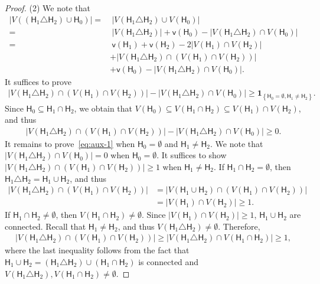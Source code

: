 \documentclass[letterpaper,11pt]{article}
\theoremstyle{definition}
\newcommand{\vn}{\mathsf{{v}}}
\newcommand{\sfH}{{\mathsf{H}}}
\newcommand{\indc}[1]{{\mathbf{1}_{\left\{{#1}\right\}}}}
\begin{document}
\begin{proof}
    (2) We note that \begin{align*}
        |V((\sfH_1\triangle \sfH_2)\cup \sfH_0)| =&~ |V(\sfH_1\triangle \sfH_2)\cup V(\sfH_0)|\\ =&~ |V(\sfH_1\triangle \sfH_2)|+\vn(\sfH_0) - |V(\sfH_1\triangle \sfH_2)\cap V(\sfH_0)|\\
        =&~\vn(\sfH_1)+\vn(\sfH_2)-2|V(\sfH_1)\cap V(\sfH_2)|\\&+|V(\sfH_1\triangle \sfH_2)\cap (V(\sfH_1)\cap V(\sfH_2))|\\&+\vn(\sfH_0) - |V(\sfH_1\triangle \sfH_2)\cap V(\sfH_0)|.
    \end{align*}
    It suffices to prove \begin{align}\label{eq:aux-1}
        |V(\sfH_1\triangle \sfH_2)\cap (V(\sfH_1)\cap V(\sfH_2))| - |V(\sfH_1\triangle \sfH_2)\cap V(\sfH_0)|\ge \indc{\sfH_0=\emptyset,\sfH_1\neq \sfH_2}.
    \end{align}
    Since $\sfH_0\subseteq \sfH_1\cap \sfH_2$, we obtain that $V(\sfH_0)\subseteq V(\sfH_1\cap \sfH_2)\subseteq V(\sfH_1)\cap V(\sfH_2)$, and thus \begin{align*}
        |V(\sfH_1\triangle \sfH_2)\cap (V(\sfH_1)\cap V(\sfH_2))| - |V(\sfH_1\triangle \sfH_2)\cap V(\sfH_0)|\ge 0.
    \end{align*}
    It remains to prove~\eqref{eq:aux-1} when $\sfH_0 = \emptyset$ and $\sfH_1\neq \sfH_2$. We note that $|V(\sfH_1\triangle \sfH_2)\cap V(\sfH_0)| = 0$ when $\sfH_0 =\emptyset$.
    It suffices to show $|V(\sfH_1\triangle \sfH_2)\cap (V(\sfH_1)\cap V(\sfH_2))|\ge 1$ when $\sfH_1\neq \sfH_2$.
    If $\sfH_1\cap \sfH_2=\emptyset$, then $\sfH_1\triangle \sfH_2 = \sfH_1\cup \sfH_2$, and thus \begin{align*}
        |V(\sfH_1\triangle \sfH_2)\cap (V(\sfH_1)\cap V(\sfH_2))| &= |V(\sfH_1\cup  \sfH_2)\cap (V(\sfH_1)\cap V(\sfH_2))|\\&=|V(\sfH_1)\cap V(\sfH_2)|\ge 1.
    \end{align*}
    If $\sfH_1\cap \sfH_2\neq \emptyset$, then $V(\sfH_1\cap \sfH_2)\neq \emptyset$. Since $|V(\sfH_1)\cap V(\sfH_2)|\ge 1$, $\sfH_1\cup \sfH_2$ are connected. Recall that $\sfH_1\neq \sfH_2$, and thus $V(\sfH_1\triangle \sfH_2)\neq \emptyset$. Therefore,\begin{align*}
        |V(\sfH_1\triangle \sfH_2)\cap (V(\sfH_1)\cap V(\sfH_2))|\ge |V(\sfH_1\triangle \sfH_2) \cap V(\sfH_1\cap \sfH_2)|\ge 1,
    \end{align*}
    where the last inequality follows from the fact that $\sfH_1\cup \sfH_2 = (\sfH_1\triangle \sfH_2)\cup (\sfH_1\cap \sfH_2)$ is connected and $V(\sfH_1\triangle \sfH_2),V(\sfH_1\cap \sfH_2)\neq \emptyset$.
\end{proof}


\end{document}
